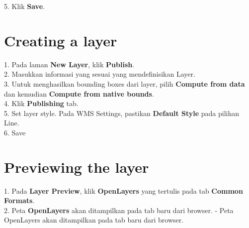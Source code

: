 \documentclass[12pt]{report}
\begin{document}
5. Klik \textbf{Save}.

\section*{Creating a layer} 
1. Pada laman \textbf{New Layer}, klik \textbf{Publish}. \\

2. Masukkan informasi yang sesuai yang mendefinisikan Layer.\\

3. Untuk menghasilkan bounding boxes dari layer, pilih \textbf{Compute from data} dan kemudian \textbf{Compute from native bounds}.\\

4. Klik \textbf{Publishing} tab.\\

5. Set layer style. Pada WMS Settings, pastikan \textbf{Default Style} pada pilihan Line.\\

6. Save 

\section*{Previewing the layer}
1. Pada \textbf{Layer Preview}, klik \textbf{OpenLayers} yang tertulis pada tab \textbf{Common Formats}.\\

2. Peta \textbf{OpenLayers} akan ditampilkan pada tab baru dari browser.
- Peta OpenLayers akan ditampilkan pada tab baru dari browser.  
\end{document}
